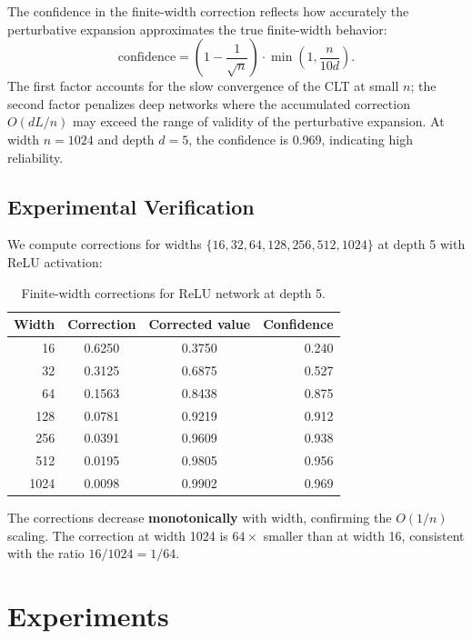 \documentclass[10pt]{article}
\theoremstyle{definition}
\begin{document}
The confidence in the finite-width correction reflects how accurately the perturbative expansion approximates the true finite-width behavior:
\begin{equation}
  \text{confidence} = \left(1 - \frac{1}{\sqrt{n}}\right) \cdot \min\!\left(1, \frac{n}{10d}\right).
\end{equation}
The first factor accounts for the slow convergence of the CLT at small $n$; the second factor penalizes deep networks where the accumulated correction $O(dL/n)$ may exceed the range of validity of the perturbative expansion.
At width $n = 1024$ and depth $d = 5$, the confidence is 0.969, indicating high reliability.

\subsection{Experimental Verification}

We compute corrections for widths $\{16, 32, 64, 128, 256, 512, 1024\}$ at depth 5 with ReLU activation:

\begin{table}[htbp]
\centering
\caption{Finite-width corrections for ReLU network at depth 5.}
\label{tab:finite-width}
\begin{tabular}{rccr}
\toprule
Width & Correction & Corrected value & Confidence \\
\midrule
16   & 0.6250 & 0.3750 & 0.240 \\
32   & 0.3125 & 0.6875 & 0.527 \\
64   & 0.1563 & 0.8438 & 0.875 \\
128  & 0.0781 & 0.9219 & 0.912 \\
256  & 0.0391 & 0.9609 & 0.938 \\
512  & 0.0195 & 0.9805 & 0.956 \\
1024 & 0.0098 & 0.9902 & 0.969 \\
\bottomrule
\end{tabular}
\end{table}

The corrections decrease \textbf{monotonically} with width, confirming the $O(1/n)$ scaling.
The correction at width 1024 is $64\times$ smaller than at width 16, consistent with the ratio $16/1024 = 1/64$.

\section{Experiments}
\label{sec:experiments}
\end{document}

